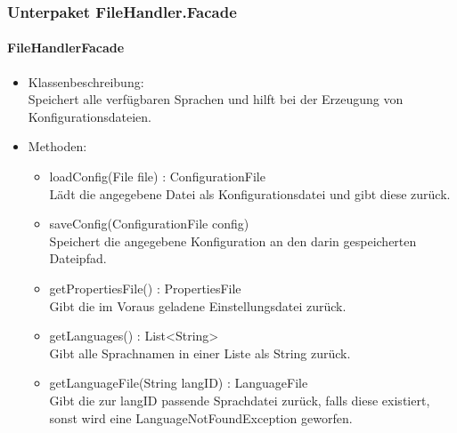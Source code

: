 \documentclass[parskip=full]{scrartcl}
\begin{document}
\subsubsection{Unterpaket FileHandler.Facade}
\paragraph{FileHandlerFacade}
\begin{itemize}
\item Klassenbeschreibung: \\
Speichert alle verfügbaren Sprachen und hilft bei der Erzeugung von Konfigurationsdateien.
\item Methoden: \\
\begin{itemize}
\item loadConfig(File file) : ConfigurationFile \\
Lädt die angegebene Datei als Konfigurationsdatei und gibt diese zurück.
\item saveConfig(ConfigurationFile config) \\
Speichert die angegebene Konfiguration an den darin gespeicherten Dateipfad.
\item getPropertiesFile() : PropertiesFile \\
Gibt die im Voraus geladene Einstellungsdatei zurück.
\item getLanguages() : List<String> \\
Gibt alle Sprachnamen in einer Liste als String zurück.
\item getLanguageFile(String langID) : LanguageFile \\
Gibt die zur langID passende Sprachdatei zurück, falls diese existiert,
sonst wird eine LanguageNotFoundException geworfen.
\end{itemize}
\end{itemize}
\end{document}
